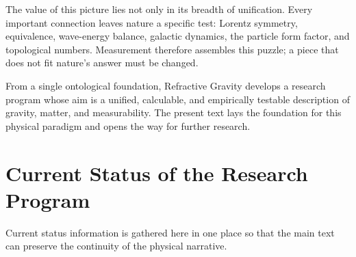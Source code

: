 \documentclass[11pt,a4paper]{article}
\begin{document}
The value of this picture lies not only in its breadth of unification. Every important connection leaves nature a specific test: Lorentz symmetry, equivalence, wave-energy balance, galactic dynamics, the particle form factor, and topological numbers. Measurement therefore assembles this puzzle; a piece that does not fit nature's answer must be changed.

From a single ontological foundation, Refractive Gravity develops a research program whose aim is a unified, calculable, and empirically testable description of gravity, matter, and measurability. The present text lays the foundation for this physical paradigm and opens the way for further research.

\section*{Current Status of the Research Program}

Current status information is gathered here in one place so that the main text can preserve the continuity of the physical narrative.
\end{document}
